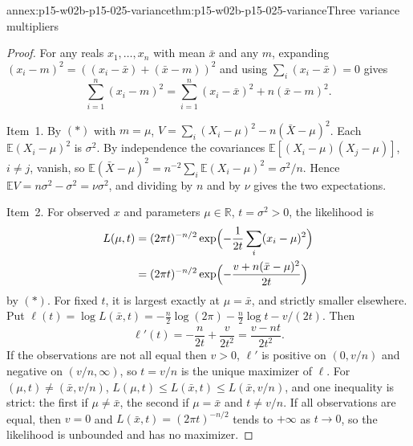 \begin{annexitem}{annex:p15-w02b-p15-025-variance}{thm:p15-w02b-p15-025-variance}{Three variance multipliers}
\begin{proof}
For any reals \(x_1,\ldots,x_n\) with mean \(\bar x\) and any \(m\),
expanding \((x_i-m)^2=((x_i-\bar x)+(\bar x-m))^2\) and using
\(\sum_i(x_i-\bar x)=0\) gives
\[
 \sum_{i=1}^n(x_i-m)^2=\sum_{i=1}^n(x_i-\bar x)^2+n(\bar x-m)^2 .
 \tag{\(*\)}
\]

Item~1. By \((*)\) with \(m=\mu\),
\(V=\sum_i(X_i-\mu)^2-n(\bar X-\mu)^2\). Each \(\mathbb E(X_i-\mu)^2\)
is \(\sigma^2\). By independence the covariances
\(\mathbb E[(X_i-\mu)(X_j-\mu)]\), \(i\ne j\), vanish, so
\(\mathbb E(\bar X-\mu)^2=n^{-2}\sum_i\mathbb E(X_i-\mu)^2=\sigma^2/n\).
Hence \(\mathbb EV=n\sigma^2-\sigma^2=\nu\sigma^2\), and dividing by
\(n\) and by \(\nu\) gives the two expectations.

Item~2. For observed \(x\) and parameters \(\mu\in\mathbb R\),
\(t=\sigma^2>0\), the likelihood is
\[
 \begin{aligned}
 L(\mu,t)&=(2\pi t)^{-n/2}\exp\Bigl(-\frac1{2t}\sum_i(x_i-\mu)^2\Bigr)\\
 &=(2\pi t)^{-n/2}\exp\Bigl(-\frac{v+n(\bar x-\mu)^2}{2t}\Bigr)
 \end{aligned}
\]
by \((*)\). For fixed \(t\), it is largest exactly at \(\mu=\bar x\),
and strictly smaller elsewhere. Put
\(\ell(t)=\log L(\bar x,t)=-\tfrac n2\log(2\pi)-\tfrac n2\log t-v/(2t)\).
Then
\[
 \ell'(t)=-\frac n{2t}+\frac v{2t^2}=\frac{v-nt}{2t^2}.
\]
If the observations are not all equal then \(v>0\), \(\ell'\) is
positive on \((0,v/n)\) and negative on \((v/n,\infty)\), so \(t=v/n\)
is the unique maximizer of \(\ell\). For
\((\mu,t)\ne(\bar x,v/n)\),
\(L(\mu,t)\le L(\bar x,t)\le L(\bar x,v/n)\), and one inequality is
strict: the first if \(\mu\ne\bar x\), the second if \(\mu=\bar x\) and
\(t\ne v/n\). If all observations are equal, then \(v=0\) and
\(L(\bar x,t)=(2\pi t)^{-n/2}\) tends to \(+\infty\) as \(t\to0\), so
the likelihood is unbounded and has no maximizer.


\end{proof}
\end{annexitem}

